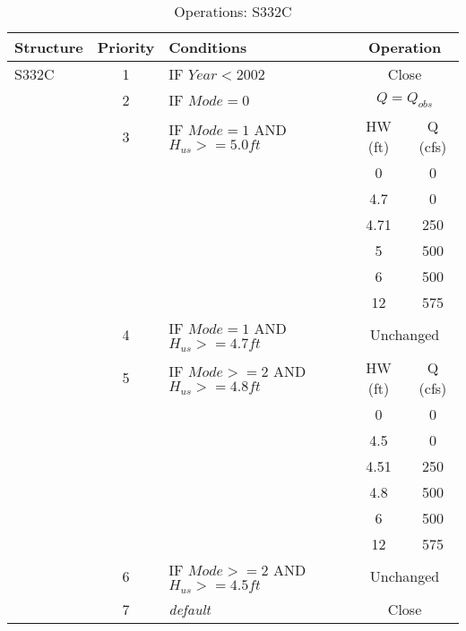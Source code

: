 \clearpage


\scriptsize
\begin{table}[!h]
\centering
\caption{Operations: S332C}
\label{tab:M11opsS332C}
\begin{tabular}{|l|c|l|c|c|}
\hline
\textbf{Structure} & \textbf{Priority}  & \textbf{Conditions} & \multicolumn{2}{|c|}{\textbf{Operation}}   \\
\hline
\hline
S332C         &  1  & IF $Year<2002$                               & \multicolumn{2}{|c|}{Close}   \\
\hline
              &  2  & IF $Mode=0$                                  & \multicolumn{2}{|c|}{$Q = Q_{obs}$}   \\
\hline
              &  3  & IF $Mode=1$ AND $H_{us}>=5.0ft$              & HW (ft) & Q (cfs)  \\
              &     &                                              & 0    &  0   \\
              &     &                                              & 4.7  &  0 \\
              &     &                                              & 4.71 &  250 \\
              &     &                                              & 5    &  500 \\
              &     &                                              & 6    &  500 \\
              &     &                                              & 12   &  575 \\
\hline
              &  4  & IF $Mode=1$ AND $H_{us}>=4.7ft$              & \multicolumn{2}{|c|}{Unchanged}   \\
\hline
              &  5  & IF $Mode>=2$ AND $H_{us}>=4.8ft$             & HW (ft) & Q (cfs)  \\
              &     &                                              & 0    &  0   \\
              &     &                                              & 4.5  &  0 \\
              &     &                                              & 4.51 &  250 \\
              &     &                                              & 4.8  &  500 \\
              &     &                                              & 6    &  500 \\
              &     &                                              & 12   &  575 \\
\hline
              &  6  & IF $Mode>=2$ AND $H_{us}>=4.5ft$             & \multicolumn{2}{|c|}{Unchanged}   \\
\hline
              &  7  & \it{default}                                 & \multicolumn{2}{|c|}{Close}           \\
\hline
\hline
\end{tabular}
\end{table}
\normalsize

